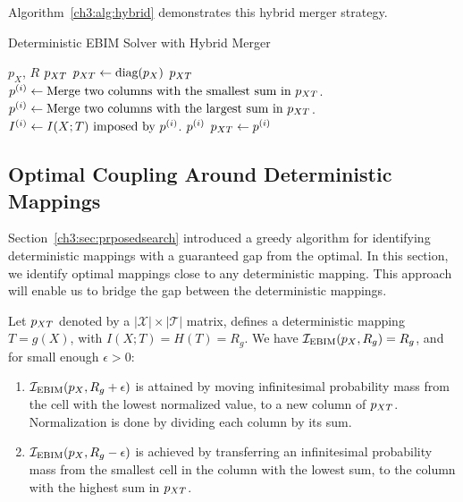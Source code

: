 Algorithm~\ref{ch3:alg:hybrid} demonstrates this hybrid merger strategy.

\begin{algorithm}
\caption{Deterministic EBIM Solver with Hybrid Merger}\label{ch3:alg:hybrid}
\begin{algorithmic}[1]
    
    \Require $p_X$, $R$
    \Ensure $p_{XT}$
    \State $p_{XT} \gets \text{diag}(p_X)$
        \State \Return $p_{XT}$
    \EndIf
        \State $p^{(i)} \gets \text{Merge two columns with the smallest sum in } p_{XT}$.
    \Else
        \State $p^{(i)} \gets \text{Merge two columns with the largest sum in } p_{XT}$.
    \EndIf
    \State $I^{(i)} \gets I(X;T) \text{ imposed by } p^{(i)}$.
        \State \Return $p^{(i)}$
    \Else
        \State $p_{XT} \gets p^{(i)}$
    \EndIf
    \EndFor
\end{algorithmic}
\end{algorithm}
\FloatBarrier

\subsection{Optimal Coupling Around Deterministic Mappings}\label{ch3:sec:neighborhood}

Section~\ref{ch3:sec:prposedsearch} introduced a greedy algorithm for identifying deterministic mappings with a guaranteed gap from the optimal. In this section, we identify optimal mappings close to any deterministic mapping. This approach will enable us to bridge the gap between the deterministic mappings.

\begin{theorem} \label{ch3:thm:neighbor}
Let $p_{XT}$ denoted by a $|\mathcal{X}| \times |\mathcal{T}|$ matrix, defines a deterministic mapping $T = g(X)$, with $ I(X;T)=H(T)=R_g $. We have $ \mathcal{I}_\text{EBIM}(p_X, R_g) = R_g $, and for small enough $ \epsilon > 0 $:
\begin{enumerate}
    \item $\mathcal{I}_\text{EBIM}(p_X, R_g + \epsilon)$ is attained by moving infinitesimal probability mass from the cell with the lowest normalized value, to a new column of $p_{XT}$. Normalization is done by dividing each column by its sum.

    \item $\mathcal{I}_\text{EBIM}(p_X, R_g - \epsilon)$ is achieved by transferring an infinitesimal probability mass from the smallest cell in the column with the lowest sum, to the column with the highest sum in $p_{XT}$.
\end{enumerate}
\end{theorem}

